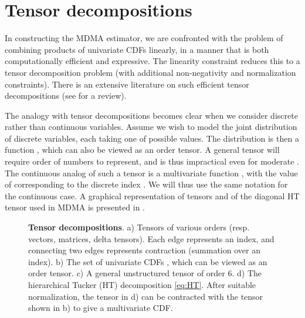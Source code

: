 \documentclass{article}
\begin{document}
\section{Tensor decompositions} \label{app:tensor_decomps}


In constructing the MDMA estimator, we are confronted with the problem of combining products of univariate CDFs linearly, in a manner that is both computationally efficient and expressive. The linearity constraint reduces this to a tensor decomposition problem (with additional non-negativity and normalization constraints). There is an extensive literature on such efficient tensor decompositions (see \cite{Cichocki2017-gp} for a review).

The analogy with tensor decompositions becomes clear when we consider discrete rather than continuous variables.
Assume  we wish to model the joint distribution of  discrete variables, each taking one of  possible values.
The distribution is then a function , which can also be viewed as an order  tensor.
A general tensor  will require order of  numbers to represent, and is thus impractical even for moderate .
The continuous analog of such a tensor is a multivariate function , with the value of  corresponding to the discrete index .
We will thus use the same notation for the continuous case. 
A graphical representation of tensors and of the diagonal HT tensor used in MDMA is presented in . 

\begin{figure}
    \centering
    \caption{\textbf{Tensor decompositions}. a) Tensors of various orders (resp. vectors, matrices, delta tensors). Each edge represents an index, and connecting two edges represents contraction (summation over an index). b) The set of univariate CDFs , which can be viewed as an order  tensor. c) A general unstructured tensor of order 6. 
d) The hierarchical Tucker (HT) decomposition \cref{eq:HT}. After suitable normalization, the tensor in d) can be contracted with the tensor  shown in b) to give a multivariate CDF. }
    \label{fig:tensor_decomps}
\end{figure}
\end{document}
